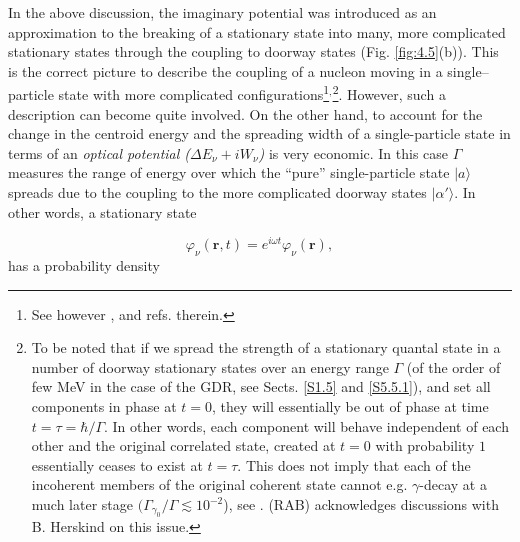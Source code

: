 In the above discussion, the imaginary potential was introduced as an approximation to  the breaking of a stationary state into many, more complicated stationary states through the coupling to doorway states (Fig. \ref{fig:4.5}(b)). This is the  correct picture to describe the coupling of a nucleon moving in a single--particle state with more complicated configurations\footnote{See however \cite{Caldeira:81}, \cite{Caldeira:83} and refs. therein.}$^,$\footnote{To be noted that if we spread the strength of a stationary quantal state in a number of doorway stationary states over an energy range $\Gamma$ (of the order of few MeV in the case of the GDR, see Sects. \ref{S1.5} and \ref{S5.5.1}), and set all components in phase at $t=0$, they will essentially be out of phase at time $t=\tau = \hbar/\Gamma$. In other words, each component will behave independent of each other and the original correlated state, created at $t=0$ with probability $1$ essentially ceases to exist at $t=\tau$. This does not imply that each of the incoherent members of the original coherent state cannot e.g. $\gamma$-decay at a much later stage $(\Gamma_{\gamma_0}/\Gamma\lesssim10^{-2}$), see \cite{Bortignon:98}. (RAB) acknowledges discussions with B. Herskind on this issue.}. However, such a description can become quite involved. On the other hand, to account for the change in the centroid energy and the spreading width of a single-particle state in terms of an {\it optical potential ($\Delta E_\nu + iW_\nu$)}  is very economic. In this case $\Gamma$ measures the range of energy over which the ``pure'' single-particle state $|a\rangle$ spreads due to the coupling to the more complicated doorway states $|\alpha'\rangle$. In other words, a stationary state

\begin{equation}
\varphi_{\nu}(\mathbf r,t) = e^{i\omega t} \varphi_{\nu}(\mathbf r) ,
\label{eqn:43}
\end{equation}
has a probability density

